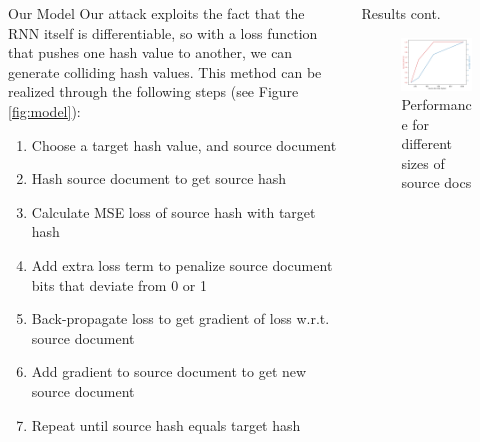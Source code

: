 \documentclass[final]{beamer}
\newlength{\onecolwid}
\newlength{\twocolwid}
\begin{document}
\begin{frame}[t]
\begin{columns}[t]
\begin{column}{\twocolwid}
\begin{columns}[t,totalwidth=\twocolwid]
\begin{column}{\onecolwid}
\begin{block}{Our Model}
Our attack exploits the fact that the RNN itself is differentiable, so with a loss
function that pushes one hash value to another, we can generate colliding
hash values.
This method can be realized through the following steps (see Figure \ref{fig:model}):
\begin{enumerate}
    \item Choose a target hash value, and source document
    \item Hash source document to get source hash
    \item Calculate MSE loss of source hash with target hash
    \item Add extra loss term to penalize source document bits that deviate from 0 or 1
    \item Back-propagate loss to get gradient of loss w.r.t. source document
    \item Add gradient to source document to get new source document
    \item Repeat until source hash equals target hash
\end{enumerate}
\end{block}


\end{column} %

\begin{column}{\onecolwid} %


\begin{block}{Results cont.}

\begin{figure}
    \includegraphics[width=0.8\linewidth]{source_doc_size}
    \caption{Performance for different sizes of source docs}
    \label{fig:docsize}
\end{figure}


\end{block}
\end{column}
\end{columns}
\end{column}
\end{columns}
\end{frame}
\end{document}
